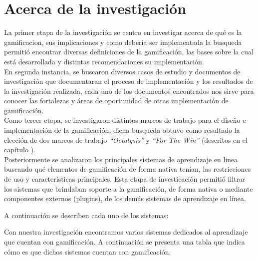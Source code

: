 


\section{Acerca de la investigación}

La primer etapa de la investigación se centro en investigar acerca de qué es la \gls{gamificacion}, sus implicaciones y como debería ser implementada la busqueda permitió encontrar diversas definiciones de la gamificación, las bases sobre la cual está desarrollada y distintas recomendaciones su implementación.\\

\noindent En segunda instancia, se buscaron diversos casos de estudio y documentos de investigación que documentaran el proceso de implementación y los resultados de la investigación realizada, cada uno de los documentos encontrados nos sirve para conocer las fortalezas y áreas de oportunidad de otras implementación de gamificación.\\

\noindent Como tercer etapa, se investigaron distintos marcos de trabajo para el diseño e implementación de la gamificación, dicha busqueda obtuvo como resultado la elección de dos marcos de trabajo {\em ``Octalysis''} \cite{Octalysis} y {\em ``For The Win''} \cite{FrameWorkForTheWin} (descritos en el capítulo ).\\

\noindent Posteriormente se analizaron los principales sistemas de aprendizaje en linea
buscando qué elementos de gamificación de forma nativa tenían, las restricciones de uso y
características principales. Esta etapa de investicación permitió filtrar los sistemas
que brindaban soporte a la gamificación, de forma nativa o mediante componentes externos
(plugins), de los demás sistemas de aprendizaje en línea.

\clearpage


A continuación se describen cada uno de los sistemas:


Con nuestra investigación encontramos varios sistemas dedicados al aprendizaje que cuentan con gamificación. A continuación se presenta una tabla que indica cómo es que dichos sistemas cuentan con gamificación.
   
